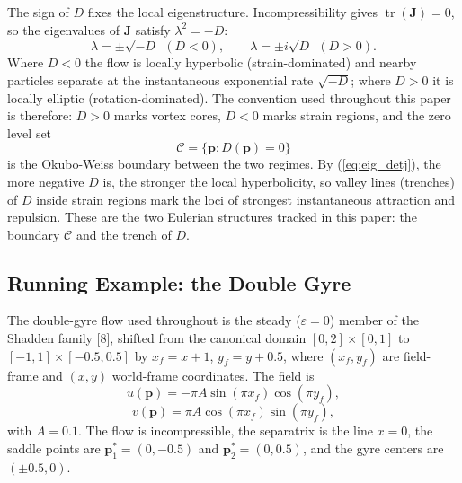 \documentclass[lettersize,journal]{IEEEtran}
\begin{document}
The sign of $D$ fixes the local eigenstructure. Incompressibility gives
$\operatorname{tr}(\mathbf{J}) = 0$, so the eigenvalues of $\mathbf{J}$
satisfy $\lambda^2 = -D$:
\begin{equation}
    \lambda = \pm\sqrt{-D} \ \ (D < 0), \qquad
    \lambda = \pm i\sqrt{D} \ \ (D > 0).
    \label{eq:eig_detj}
\end{equation}
Where $D < 0$ the flow is locally hyperbolic (strain-dominated) and
nearby particles separate at the instantaneous exponential rate
$\sqrt{-D}$; where $D > 0$ it is locally elliptic (rotation-dominated).
The convention used throughout this paper is therefore: $D > 0$ marks
vortex cores, $D < 0$ marks strain regions, and the zero level set
\begin{equation}
    \mathcal{C} = \{\mathbf{p} : D(\mathbf{p}) = 0\}
    \label{eq:ow_boundary}
\end{equation}
is the Okubo-Weiss boundary between the two regimes. By
(\ref{eq:eig_detj}), the more negative $D$ is, the stronger the local
hyperbolicity, so valley lines (trenches) of $D$ inside strain regions
mark the loci of strongest instantaneous attraction and repulsion. These
are the two Eulerian structures tracked in this paper: the boundary
$\mathcal{C}$ and the trench of $D$.

\subsection{Running Example: the Double Gyre}
\label{sec:dg_example}

The double-gyre flow used throughout is the steady ($\varepsilon = 0$)
member of the Shadden family [8], shifted from the canonical domain
$[0,2] \times [0,1]$ to $[-1,1] \times [-0.5, 0.5]$ by
$x_f = x + 1$, $y_f = y + 0.5$, where $(x_f, y_f)$ are field-frame and
$(x, y)$ world-frame coordinates. The field is
\begin{equation}
    u(\mathbf{p}) = -\pi A \sin(\pi x_f) \cos(\pi y_f), \label{eq:dg_u}
\end{equation}
\begin{equation}
    v(\mathbf{p}) = \pi A \cos(\pi x_f) \sin(\pi y_f), \label{eq:dg_v}
\end{equation}
with $A = 0.1$. The flow is incompressible, the separatrix is the line
$x = 0$, the saddle points are $\mathbf{p}^*_1 = (0, -0.5)$ and
$\mathbf{p}^*_2 = (0, 0.5)$, and the gyre centers are $(\pm 0.5, 0)$.
\end{document}
